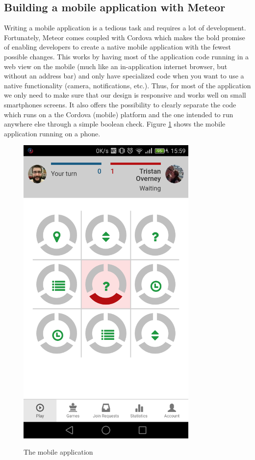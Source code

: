 \subsection{Building a mobile application with Meteor}
Writing a mobile application is a tedious task and requires a lot of development. Fortunately, Meteor comes coupled with Cordova\cite{cordova} which makes the bold promise of enabling developers to create a native mobile application with the fewest possible changes. This works by having most of the application code running in a web view on the mobile (much like an in-application internet browser, but without an address bar) and only have specialized code when you want to use a native functionality (camera, notifications, etc.). Thus, for most of the application we only need to make sure that our design is responsive and works well on small smartphones screens. It also offers the possibility to clearly separate the code which runs on a the Cordova (mobile) platform and the one intended to run anywhere else through a simple boolean check. Figure \ref{fig:mobscreen} shows the mobile application running on a phone.

\begin{figure}
\centering
{\includegraphics[width=3.5in]{images/mobile_screenshot.png}}
\caption{The mobile application}
\label{fig:mobscreen}
\end{figure}

